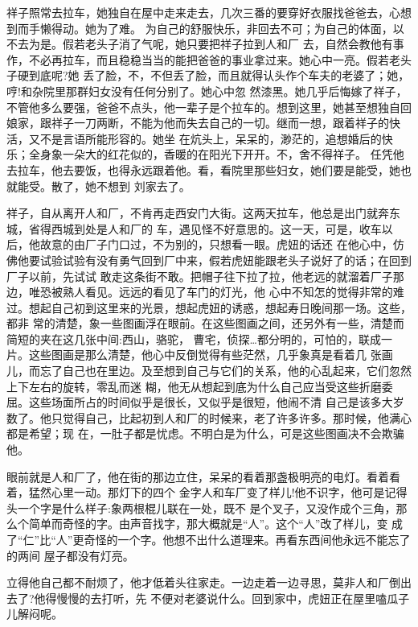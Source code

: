 \documentclass[11pt,a4paper,onecolumn]{article}
\begin{document}
祥子照常去拉车，她独自在屋中走来走去，几次三番的要穿好衣服找爸爸去，心想到而手懒得动。她为了难。
为自己的舒服快乐，非回去不可；为自己的体面，以不去为是。假若老头子消了气呢，她只要把祥子拉到人和厂
去，自然会教他有事作，不必再拉车，而且稳稳当当的能把爸爸的事业拿过来。她心中一亮。假若老头子硬到底呢?她
丢了脸，不，不但丢了脸，而且就得认头作个车夫的老婆了；她，哼!和杂院里那群妇女没有任何分别了。她心中忽
然漆黑。她几乎后悔嫁了祥子，不管他多么要强，爸爸不点头，他一辈子是个拉车的。想到这里，她甚至想独自回
娘家，跟祥子一刀两断，不能为他而失去自己的一切。继而一想，跟着祥子的快活，又不是言语所能形容的。她坐
在炕头上，呆呆的，渺茫的，追想婚后的快乐；全身象一朵大的红花似的，香暖的在阳光下开开。不，舍不得祥子。
任凭他去拉车，他去要饭，也得永远跟着他。看，看院里那些妇女，她们要是能受，她也就能受。散了，她不想到
刘家去了。

祥子，自从离开人和厂，不肯再走西安门大街。这两天拉车，他总是出门就奔东城，省得西城到处是人和厂的
车，遇见怪不好意思的。这一天，可是，收车以后，他故意的由厂子门口过，不为别的，只想看一眼。虎妞的话还
在他心中，仿佛他要试验试验有没有勇气回到厂中来，假若虎妞能跟老头子说好了的话；在回到厂子以前，先试试
敢走这条街不敢。把帽子往下拉了拉，他老远的就溜着厂子那边，唯恐被熟人看见。远远的看见了车门的灯光，他
心中不知怎的觉得非常的难过。想起自己初到这里来的光景，想起虎妞的诱惑，想起寿日晚间那一场。这些，都非
常的清楚，象一些图画浮在眼前。在这些图画之间，还另外有一些，清楚而简短的夹在这几张中间:西山，骆驼，
曹宅，侦探\ldots 都分明的，可怕的，联成一片。这些图画是那么清楚，他心中反倒觉得有些茫然，几乎象真是看着几
张画儿，而忘了自己也在里边。及至想到自己与它们的关系，他的心乱起来，它们忽然上下左右的旋转，零乱而迷
糊，他无从想起到底为什么自己应当受这些折磨委屈。这些场面所占的时间似乎是很长，又似乎是很短，他闹不清
自己是该多大岁数了。他只觉得自己，比起初到人和厂的时候来，老了许多许多。那时候，他满心都是希望；现
在，一肚子都是忧虑。不明白是为什么，可是这些图画决不会欺骗他。

眼前就是人和厂了，他在街的那边立住，呆呆的看着那盏极明亮的电灯。看着看着，猛然心里一动。那灯下的四个
金字\myrule 人和车厂\myrule 变了样儿!他不识字，他可是记得头一个字是什么样子:象两根棍儿联在一处，既不
是个叉子，又没作成个三角，那么个简单而奇怪的字。由声音找字，那大概就是``人''。这个``人''改了样儿，变
成了``仁''\myrule 比``人''更奇怪的一个字。他想不出什么道理来。再看东西间\myrule 他永远不能忘了的两间
屋子\myrule 都没有灯亮。

立得他自己都不耐烦了，他才低着头往家走。一边走着一边寻思，莫非人和厂倒出去了?他得慢慢的去打听，先
不便对老婆说什么。回到家中，虎妞正在屋里嗑瓜子儿解闷呢。
\end{document}
